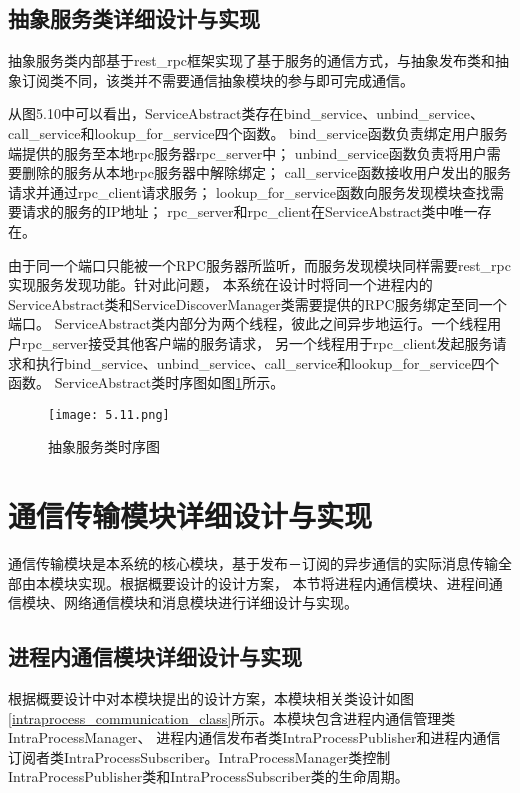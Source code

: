 \subsection{抽象服务类详细设计与实现}
抽象服务类内部基于rest\_rpc框架实现了基于服务的通信方式，与抽象发布类和抽象订阅类不同，该类并不需要通信抽象模块的参与即可完成通信。

从图5.10中可以看出，ServiceAbstract类存在bind\_service、unbind\_service、call\_service和lookup\_for\_service四个函数。
bind\_service函数负责绑定用户服务端提供的服务至本地rpc服务器rpc\_server中；
unbind\_service函数负责将用户需要删除的服务从本地rpc服务器中解除绑定；
call\_service函数接收用户发出的服务请求并通过rpc\_client请求服务；
lookup\_for\_service函数向服务发现模块查找需要请求的服务的IP地址；
rpc\_server和rpc\_client在ServiceAbstract类中唯一存在。

由于同一个端口只能被一个RPC服务器所监听，而服务发现模块同样需要rest\_rpc实现服务发现功能。针对此问题，
本系统在设计时将同一个进程内的ServiceAbstract类和ServiceDiscoverManager类需要提供的RPC服务绑定至同一个端口。
ServiceAbstract类内部分为两个线程，彼此之间异步地运行。一个线程用户rpc\_server接受其他客户端的服务请求，
另一个线程用于rpc\_client发起服务请求和执行bind\_service、unbind\_service、call\_service和lookup\_for\_service四个函数。
ServiceAbstract类时序图如图\ref{service_abstract_timesequence}所示。
\begin{figure}[H]
  \centering
  \texttt{[image: 5.11.png]}
  \caption{抽象服务类时序图}
  \label{service_abstract_timesequence}
\end{figure}

\section{通信传输模块详细设计与实现}
通信传输模块是本系统的核心模块，基于发布－订阅的异步通信的实际消息传输全部由本模块实现。根据概要设计的设计方案，
本节将进程内通信模块、进程间通信模块、网络通信模块和消息模块进行详细设计与实现。
\subsection{进程内通信模块详细设计与实现}
根据概要设计中对本模块提出的设计方案，本模块相关类设计如图\ref{intraprocess_communication_class}所示。本模块包含进程内通信管理类IntraProcessManager、
进程内通信发布者类IntraProcessPublisher和进程内通信订阅者类IntraProcessSubscriber。IntraProcessManager类控制
IntraProcessPublisher类和IntraProcessSubscriber类的生命周期。

